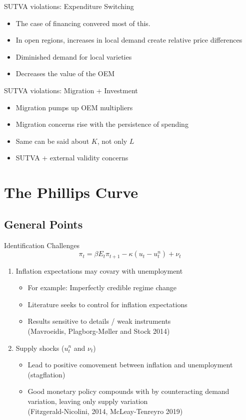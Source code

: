 \documentclass[english,xcolor=svgnames]{beamer}
\begin{document}
\begin{frame}{SUTVA violations: Expenditure Switching}
\begin{itemize}
\item The case of financing convered most of this.
\item In open regions, increases in local demand create relative price differences
\item Diminished demand for local varieties
\item Decreases the value of the OEM
\end{itemize}
\end{frame}

\begin{frame}{SUTVA violations: Migration + Investment}
\begin{itemize}
\item Migration pumps up OEM multipliers
\item Migration concerns rise with the persistence of spending
\item Same can be said about $K$, not only $L$
\item SUTVA + external validity concerns
\end{itemize}
\end{frame}

\section{The Phillips Curve}

\subsection{General Points}

\begin{frame}{Identification Challenges}
	\[ \pi_{t} = \beta E_{t} \pi_{t+1} - \kappa (u_{t} - u_{t}^{n} ) + \nu_{t} \] \vspace{-10pt}
	\begin{enumerate}
		\itemsep1em 
		\item Inflation expectations may covary with unemployment
		\begin{itemize}
			\item For example: Imperfectly credible regime change
			\item Literature seeks to control for inflation expectations
			\item Results sensitive to details / weak instruments \\ (Mavroeidis, Plagborg-Møller and Stock 2014) 
		\end{itemize}
		\item Supply shocks ($u^n_t$ and $\nu_t$)
		\begin{itemize}
			\item Lead to positive comovement between inflation and unemployment (stagflation)
			\item Good monetary policy compounds with by counteracting demand variation, leaving only supply variation \\ (Fitzgerald-Nicolini, 2014, McLeay-Tenreyro 2019)
		\end{itemize}
	\end{enumerate}
\end{frame}
\end{document}
